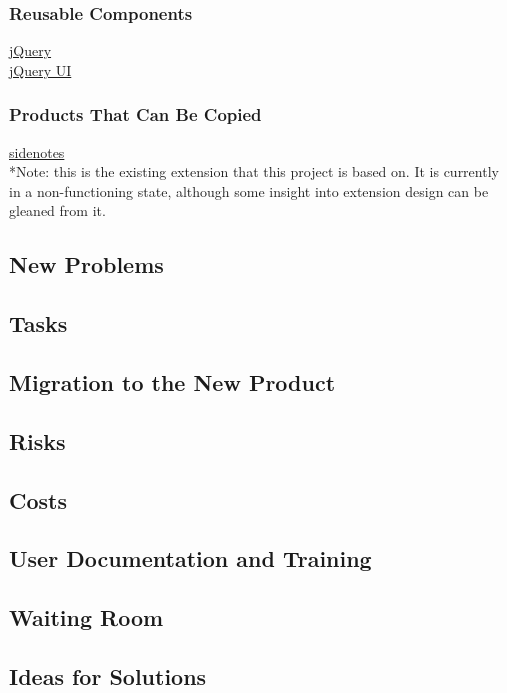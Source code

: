 \documentclass[12pt, titlepage]{article}
\begin{document}
\subsubsection{Reusable Components}
	\href{https://jquery.com}
	{jQuery}\\
	\href{http://jqueryui.com/}
	{jQuery UI}
	
\subsubsection{Products That Can Be Copied}
	\href{https://github.com/sidenotes/sidenotes}
	{sidenotes}\\
	*Note: this is the existing extension that this project is based on. It is currently in a non-functioning state, although some insight into extension design can be gleaned from it.
\subsection{New Problems}

\subsection{Tasks}

\subsection{Migration to the New Product}

\subsection{Risks}

\subsection{Costs}

\subsection{User Documentation and Training}

\subsection{Waiting Room}

\subsection{Ideas for Solutions}
\end{document}
